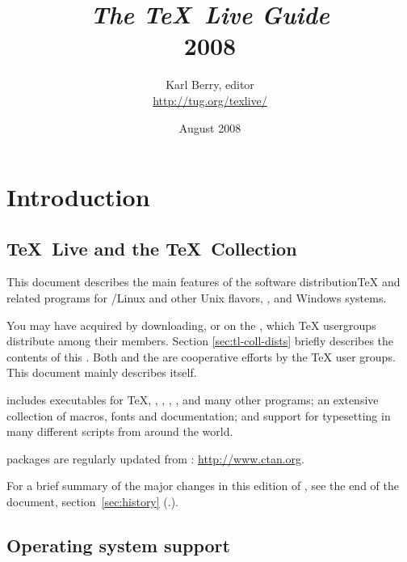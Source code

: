\documentclass{article}
\begin{document}
\title{%
  {\huge \textit{The \TeX\ Live Guide}\\\smallskip}%
  {\LARGE \textsf{\TL{} 2008}}%
}

\author{Karl Berry, editor \\[3mm]
        \url{http://tug.org/texlive/}
       }

\date{August 2008}

\maketitle

\begin{multicols}{2}
\tableofcontents
\end{multicols}

\section{Introduction}
\label{sec:intro}

\subsection{\TeX\ Live and the \TeX\ Collection}

This document describes the main features of the \TL{} software
distribution\Dash \TeX{} and related programs for \GNU/Linux
and other Unix flavors, \MacOSX, and Windows systems.

You may have acquired \TL{} by downloading, or on the \TK{} \DVD,
which \TeX{} usergroups distribute among their members. Section
\ref{sec:tl-coll-dists} briefly describes the contents of this \DVD.
Both \TL{} and the \TK{} are cooperative efforts by the \TeX{} user
groups. This document mainly describes \TL{} itself.

\TL{} includes executables for \TeX{}, \LaTeXe{}, \ConTeXt,
\MF, \MP, \BibTeX{} and many other programs; an extensive collection
of macros, fonts and documentation; and support for typesetting in
many different scripts from around the world.

\TL{} packages are regularly updated from
: \url{http://www.ctan.org}.

For a brief summary of the major changes in this edition of \TL{},
see the end of the document, section~\ref{sec:history}
(\p.\pageref{sec:history}).

\subsection{Operating system support}
\label{sec:os-support}
\end{document}
